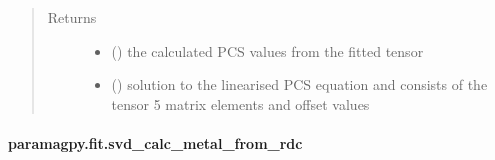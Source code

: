 \documentclass[a4paper,10pt,english,openany,oneside]{sphinxmanual}
\begin{document}
\begin{fulllineitems}
\begin{quote}
\begin{description}
\begin{itemize}
\end{itemize}

\item[{Returns}] \leavevmode
\sphinxAtStartPar
\begin{itemize}
\item {} 
\sphinxAtStartPar
{} () \textendash{} the calculated PCS values from the fitted tensor

\item {} 
\sphinxAtStartPar
{} () \textendash{} solution to the linearised PCS equation and
consists of the tensor 5 matrix elements and offset values

\end{itemize}


\end{description}\end{quote}

\end{fulllineitems}



\paragraph{paramagpy.fit.svd\_calc\_metal\_from\_rdc}
\label{\detokenize{reference/generated/paramagpy.fit.svd_calc_metal_from_rdc:paramagpy-fit-svd-calc-metal-from-rdc}}\label{\detokenize{reference/generated/paramagpy.fit.svd_calc_metal_from_rdc::doc}}
\end{document}

